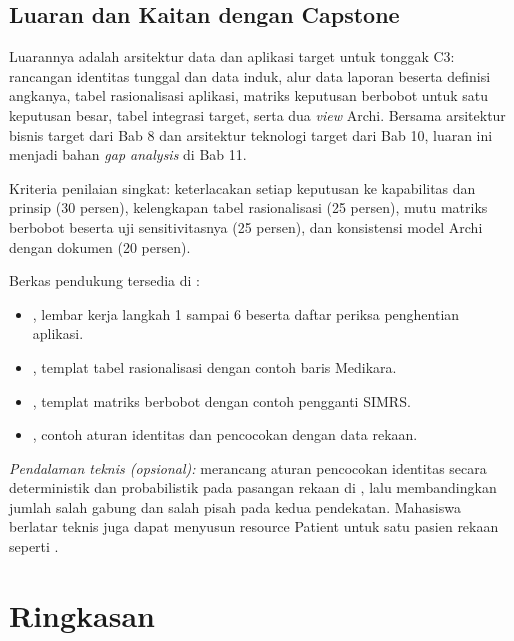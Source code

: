 \subsection*{Luaran dan Kaitan dengan Capstone}

Luarannya adalah arsitektur data dan aplikasi target untuk tonggak C3:
rancangan identitas tunggal dan data induk, alur data laporan beserta
definisi angkanya, tabel rasionalisasi aplikasi, matriks keputusan berbobot
untuk satu keputusan besar, tabel integrasi target, serta dua \textit{view}
Archi. Bersama arsitektur bisnis target dari Bab 8 dan arsitektur teknologi
target dari Bab 10, luaran ini menjadi bahan \textit{gap analysis} di Bab 11.

Kriteria penilaian singkat: keterlacakan setiap keputusan ke kapabilitas dan
prinsip (30 persen), kelengkapan tabel rasionalisasi (25 persen), mutu
matriks berbobot beserta uji sensitivitasnya (25 persen), dan konsistensi
model Archi dengan dokumen (20 persen).

Berkas pendukung tersedia di :
\begin{itemize}
  \item {}, lembar kerja
        langkah 1 sampai 6 beserta daftar periksa penghentian aplikasi.
  \item {},
        templat tabel rasionalisasi dengan contoh baris Medikara.
  \item {},
        templat matriks berbobot dengan contoh pengganti SIMRS.
  \item {}, contoh
        aturan identitas dan pencocokan dengan data rekaan.
\end{itemize}

\textit{Pendalaman teknis (opsional):} merancang aturan pencocokan identitas
secara deterministik dan probabilistik pada pasangan rekaan di
, lalu
membandingkan jumlah salah gabung dan salah pisah pada kedua pendekatan.
Mahasiswa berlatar teknis juga dapat menyusun resource Patient untuk satu
pasien rekaan seperti .

\section{Ringkasan}

